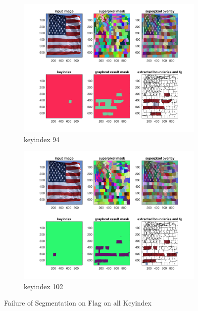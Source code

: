 \begin{figure}[htbp]
\begin{subfigure}[t]{0.49\textwidth}
        \includegraphics[width=\textwidth]{hw5/flag1.png}
		\caption{keyindex 94}\label{fig:22e}
    \end{subfigure}
    \begin{subfigure}[t]{0.49\textwidth}
	    \centering
        \includegraphics[width=\textwidth]{hw5/flag2.png}
		\caption{keyindex 102}\label{fig:22f}
    \end{subfigure}
    \caption{Failure of Segmentation on Flag on all Keyindex}
    \label{fig:22}
\end{figure}


